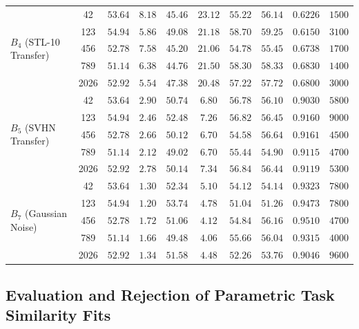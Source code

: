 \documentclass[sn-mathphys,Numbered]{sn-jnl}
\begin{document}
\begin{appendices}
\begin{table}[t]
{\begin{tabular}{l c c c c c c c c c}
\midrule
\multirow{5}{*}{$B_4$ (STL-10 Transfer)}
 & 42 & $53.64$ & $8.18$ & $45.46$ & $23.12$ & $55.22$ & $56.14$ & $0.6226$ & $1500$ \\
 & 123 & $54.94$ & $5.86$ & $49.08$ & $21.18$ & $58.70$ & $59.25$ & $0.6150$ & $3100$ \\
 & 456 & $52.78$ & $7.58$ & $45.20$ & $21.06$ & $54.78$ & $55.45$ & $0.6738$ & $1700$ \\
 & 789 & $51.14$ & $6.38$ & $44.76$ & $21.50$ & $58.30$ & $58.33$ & $0.6830$ & $1400$ \\
 & 2026 & $52.92$ & $5.54$ & $47.38$ & $20.48$ & $57.22$ & $57.72$ & $0.6800$ & $3000$ \\
\midrule
\multirow{5}{*}{$B_5$ (SVHN Transfer)}
 & 42 & $53.64$ & $2.90$ & $50.74$ & $6.80$ & $56.78$ & $56.10$ & $0.9030$ & $5800$ \\
 & 123 & $54.94$ & $2.46$ & $52.48$ & $7.26$ & $56.82$ & $56.45$ & $0.9160$ & $9000$ \\
 & 456 & $52.78$ & $2.66$ & $50.12$ & $6.70$ & $54.58$ & $56.64$ & $0.9161$ & $4500$ \\
 & 789 & $51.14$ & $2.12$ & $49.02$ & $6.70$ & $55.44$ & $54.90$ & $0.9115$ & $4700$ \\
 & 2026 & $52.92$ & $2.78$ & $50.14$ & $7.34$ & $56.84$ & $56.44$ & $0.9119$ & $5300$ \\
\midrule
\multirow{5}{*}{$B_7$ (Gaussian Noise)}
 & 42 & $53.64$ & $1.30$ & $52.34$ & $5.10$ & $54.12$ & $54.14$ & $0.9323$ & $7800$ \\
 & 123 & $54.94$ & $1.20$ & $53.74$ & $4.78$ & $51.04$ & $51.26$ & $0.9473$ & $7800$ \\
 & 456 & $52.78$ & $1.72$ & $51.06$ & $4.12$ & $54.84$ & $56.16$ & $0.9510$ & $4700$ \\
 & 789 & $51.14$ & $1.66$ & $49.48$ & $4.06$ & $55.66$ & $56.04$ & $0.9315$ & $4000$ \\
 & 2026 & $52.92$ & $1.34$ & $51.58$ & $4.48$ & $52.26$ & $53.76$ & $0.9046$ & $9600$ \\
\bottomrule
\end{tabular}%
}
\end{table}

\subsection{Evaluation and Rejection of Parametric Task Similarity Fits}\label{subsec:appendix_fits}


\end{appendices}
\end{document}
